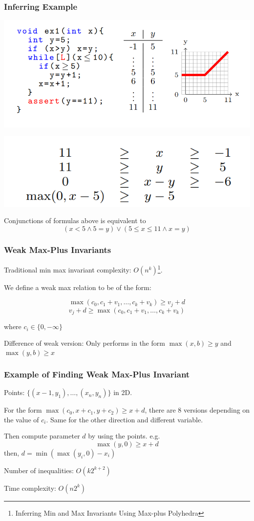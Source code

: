 \documentclass[11pt]{beamer}
\begin{document}
\begin{frame}\frametitle{Inferring Example}
\includegraphics[scale=0.24]{1.png}
\begin{center}
\includegraphics[scale=0.34]{4.png}
\end{center}
Conjunctions of formulas above is equivalent to 
\[(x < 5 \wedge 5 = y) \vee (5 \le x \le 11 \wedge x = y)\]
\end{frame}


\begin{frame}\frametitle{Weak Max-Plus Invariants}
Traditional min max invariant complexity: $O(n^k)$\footnote{Inferring Min and Max Invariants Using Max-plus Polyhedra}.

We define a weak max relation to be of the form: 

\[\max(c_0, c_1 + v_1, \ldots, c_k + v_k) \ge v_j + d\]
\[v_j + d \ge \max(c_0,c_1 + v_1, \ldots, c_k + v_k)\]

where $c_i \in \{0, -\infty\}$

Difference of weak version: 
Only  performs in the form $\max(x, b) \ge y$ and $\max(y, b)\ge x$


\end{frame}

\begin{frame}\frametitle{Example of Finding Weak Max-Plus Invariant}
Points: $\{(x-1, y_1), \ldots, (x_n, y_n)\}$ in 2D. 

For the form $\max(c_0, x + c_1, y + c_2) \ge x + d$, there are 8 versions depending on the value of $c_i$. Same for the other direction and different variable. 

Then compute parameter $d$ by using the points. e.g.
\[\max(y,0)\ge x + d\]
then, $d = \min(\max(y_i, 0) - x_i)$

Number of inequalities: $O(k2^{k+2})$

Time complexity: $O(n2^k)$




\end{frame}
\end{document}

